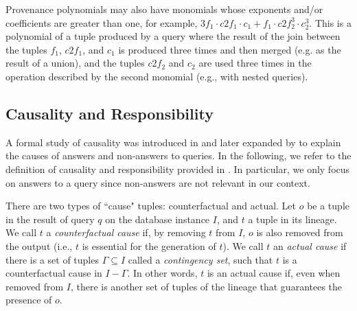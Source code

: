 \documentclass[preprint,12pt,sort&compress]{elsarticle}
\newcommand{\rtwo}[1]{\textcolor{reviewer2}{#1}}
\newcommand{\scream}[1]{{\bf * #1 *}{\typeout{#1}}}
\begin{document}
Provenance polynomials may also have monomials whose exponents and/or coefficients are greater than one, for example, $3f_1 \cdot c2f_1 \cdot c_1 + f_1 \cdot c2f_2^3 \cdot c_2^3$. This is a polynomial of a tuple produced by a query where the result of the join between the tuples $f_1$, $c2f_1$, and $c_1$ is produced three times and then merged (e.g. as the result of a union), and the tuples $c2f_2$ and $c_2$ are used three times in the operation described by the second monomial (e.g., with nested queries). 

\rtwo{\subsection{Causality and Responsibility}}
\label{sec:responsibility}

A formal study of causality was introduced in \cite{Halpern2013Causality,ChocklerH04} and later expanded by \citet{MeliouGMS11} to explain the causes of answers and non-answers to queries. 
In the following, we refer to the definition of causality and responsibility provided in \cite{MeliouGMS11}. 
In particular, we only focus on answers to a query since non-answers are not relevant in our context.


There are two types of ``cause" tuples: counterfactual and actual. 
Let $o$ be a tuple in the result of query $q$ on the database instance $I$, and $t$ a tuple in its lineage. We call $t$ a \emph{counterfactual cause} if, by removing $t$ from $I$, $o$ is also removed from the output (i.e., $t$ is essential for the generation of $t$). 
We call $t$ an \emph{actual cause} if there is a set of tuples $\Gamma \subseteq I$ called a \emph{contingency set}, such that $t$ is a counterfactual cause in $I - \Gamma$. In other words, $t$ is an actual cause if, even when removed from $I$, there is another set of tuples of the lineage that guarantees the presence of $o$.
\end{document}
